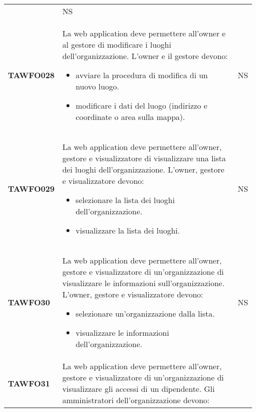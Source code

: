\documentclass[../piano-di-qualifica.tex]{subfiles}
\begin{document}
\begin{centering}
\begin{longtable}[H]{>{\centering\bfseries}m{3cm} >{}p{10cm} >{\centering\arraybackslash}m{3cm}}
\begin{itemize}
                        \end{itemize}
                      & NS \\
        TAWFO028      & La web application deve permettere all'owner e al gestore di modificare i luoghi dell'organizzazione. \newline
                        L'owner e il gestore devono:
                        \begin{itemize}
                          \item avviare la procedura di modifica di un nuovo luogo.
                          \item modificare i dati del luogo (indirizzo e coordinate o area sulla mappa).
                        \end{itemize}
                      & NS \\
        TAWFO029      & La web application deve permettere all'owner, gestore e visualizzatore di visualizzare una lista dei luoghi dell'organizzazione. \newline
                        L'owner, gestore e visualizzatore devono:
                        \begin{itemize}
                          \item selezionare la lista dei luoghi dell'organizzazione.
                          \item visualizzare la lista dei luoghi.
                        \end{itemize}
                      & NS \\
        TAWFO30       & La web application deve permettere all'owner, gestore e visualizzatore di un'organizzazione di visualizzare le informazioni sull'organizzazione. \newline
                        L'owner, gestore e visualizzatore devono:
                        \begin{itemize}
                          \item selezionare un'organizzazione dalla lista.
                          \item visualizzare le informazioni dell'organizzazione.
                        \end{itemize}
                      & NS \\
        TAWFO31       & La web application deve permettere all'owner, gestore e visualizzatore di un'organizzazione di visualizzare gli accessi di un dipendente. \newline
                        Gli amministratori dell'organizzazione devono:

\end{longtable}
\end{centering}
\end{document}

